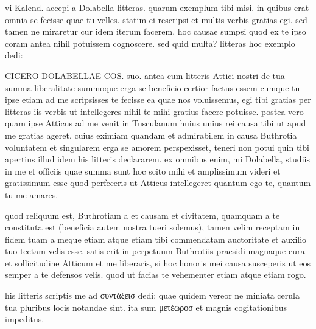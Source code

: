 


 vi Kalend. accepi a Dolabella litteras. quarum exemplum tibi misi. in quibus erat omnia se fecisse quae tu velles. statim ei rescripsi et multis verbis gratias egi. sed tamen ne miraretur cur idem iterum facerem, hoc causae sumpsi quod ex te ipso coram antea nihil potuissem cognoscere. sed quid multa? litteras hoc exemplo dedi:

 CICERO DOLABELLAE COS. suo. antea cum litteris Attici nostri de tua summa liberalitate summoque erga se beneficio certior factus essem cumque tu ipse etiam ad me scripsisses te fecisse ea quae nos voluissemus, egi tibi gratias per litteras iis verbis ut intellegeres nihil te mihi gratius facere potuisse. postea vero quam ipse Atticus ad me venit in Tusculanum huius unius rei causa tibi ut apud me gratias ageret, cuius eximiam quandam et admirabilem in causa Buthrotia voluntatem et singularem erga se amorem perspexisset, teneri non potui quin tibi apertius illud idem his litteris declararem. ex omnibus enim, mi Dolabella, studiis in me et officiis quae summa sunt hoc scito mihi et amplissimum videri et gratissimum esse quod perfeceris ut Atticus intellegeret quantum ego te, quantum tu me amares.

 quod reliquum est, Buthrotiam a et causam et civitatem, quamquam a te constituta est (beneficia autem nostra tueri solemus), tamen velim receptam in fidem tuam a meque etiam atque etiam tibi commendatam auctoritate et auxilio tuo tectam velis esse. satis erit in perpetuum Buthrotiis praesidi magnaque cura et sollicitudine Atticum et me liberaris, si hoc honoris mei causa susceperis ut eos semper a te defensos velis. quod ut facias te vehementer etiam atque etiam rogo.

 his litteris scriptis me ad συντάξεισ dedi; quae quidem vereor ne miniata cerula tua pluribus locis notandae sint. ita sum μετέωροσ et magnis cogitationibus impeditus.
